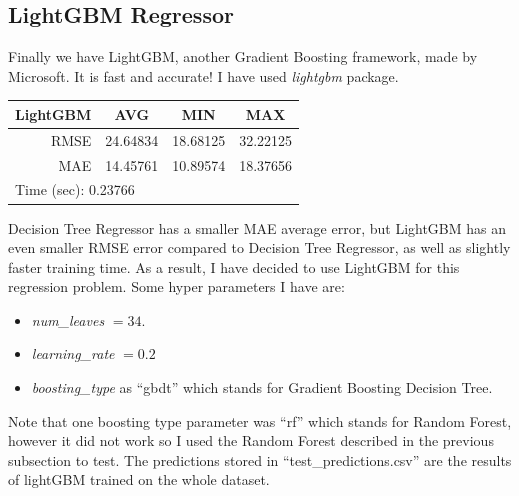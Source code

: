 \documentclass[11pt,reqno]{amsart}
\begin{document}
\subsection{LightGBM Regressor}
Finally we have LightGBM, another Gradient Boosting framework, made by Microsoft. It is fast and accurate! I have used \textit{lightgbm} package.
\begin{table}[]
\begin{tabular}{|c|l|l|l|}
\hline
LightGBM & \multicolumn{1}{c|}{AVG} & \multicolumn{1}{c|}{MIN} & \multicolumn{1}{c|}{MAX} \\ \hline
\multicolumn{1}{|r|}{RMSE} & 24.64834 & 18.68125 & 32.22125 \\ \hline
\multicolumn{1}{|r|}{MAE} & 14.45761 & 10.89574  & 18.37656 \\ \hline
\multicolumn{4}{|l|}{Time (sec): 0.23766} \\ \hline
\end{tabular}
\end{table}
Decision Tree Regressor has a smaller MAE average error, but LightGBM has an even smaller RMSE error compared to Decision Tree Regressor, as well as slightly faster training time. As a result, I have decided to use LightGBM for this regression problem. Some hyper parameters I have are:
\begin{itemize}
	\item \textit{num\_leaves} $=34$. 
	\item \textit{learning\_rate} $=0.2$
	\item \textit{boosting\_type} as ``gbdt'' which stands for Gradient Boosting Decision Tree.
\end{itemize}
Note that one boosting type parameter was ``rf'' which stands for Random Forest, however it did not work so I used the Random Forest described in the previous subsection to test. The predictions stored in ``test\_predictions.csv'' are the results of lightGBM trained on the whole dataset. 
\end{document}
